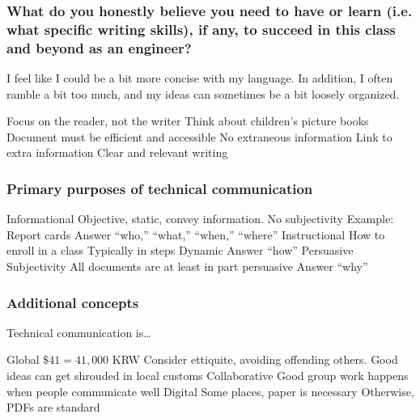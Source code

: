 \subsubsection{What do you honestly believe you need to have or learn (i.e. what specific writing skills), if any, to succeed in this class and beyond as an engineer?}

I feel like I could be a bit more concise with my language. In addition, I often ramble a bit too much, and my ideas can sometimes be a bit loosely organized.

\begin{outline}
    \1 Focus on the reader, not the writer 
        \2 Think about children's picture books
    \1 Document must be efficient and accessible
        \2 No extraneous information
        \2 Link to extra information
    \1 Clear and relevant writing
\end{outline}

\subsubsection{Primary purposes of technical communication}

\begin{outline}
    \1 Informational
        \2 Objective, static, convey information. 
        \2 No subjectivity
        \2 Example: Report cards
        \2 Answer ``who,'' ``what,'' ``when,'' ``where''
    \1 Instructional    
        \2 How to enroll in a class 
        \2 Typically in steps
        \2 Dynamic
        \2 Answer ``how''
    \1 Persuasive
        \2 Subjectivity
        \2 All documents are at least in part persuasive
        \2 Answer ``why''
\end{outline}

\subsubsection{Additional concepts}

Technical communication is\dots

\begin{outline}
    \1 Global
        \2 $\$41 = 41,000$ KRW
        \2 Consider ettiquite, avoiding offending others. Good ideas can get shrouded in local customs
    \1 Collaborative
        \2 Good group work happens when people communicate well
    \1 Digital
        \2 Some places, paper is necessary
        \2 Otherwise, PDFs are standard
\end{outline}

